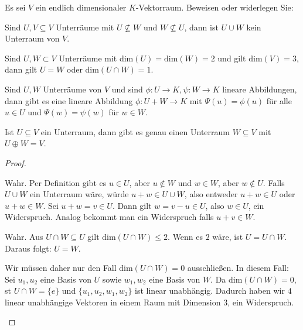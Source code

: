 \begin{Problem}
	Es sei $V$ ein endlich dimensionaler $K$-Vektorraum. Beweisen oder widerlegen Sie:
\begin{parts}
\item Sind $U,V\subseteq V$ Unterräume mit $U\not\subseteq W$ und $W\not\subseteq U$, dann ist $U\cup W$ kein Unterraum von $V$.
\item Sind $U,W\subset V$ Unterräume mit $\text{dim}(U)=\text{dim}(W)=2$ und gilt $\text{dim}(V)=3$, dann gilt $U=W$ oder $\text{dim}(U\cap W)=1$.
\item Sind $U,W$ Unterräume von $V$ und sind $\phi:U\to K,\psi:W\to K$ lineare Abbildungen, dann gibt es eine lineare Abbildung $\phi:U+W\to K$ mit $\Psi(u)=\phi(u)$ f\"{u}r alle $u\in U$ und $\Psi(w)=\psi(w)$ f\"{u}r $w\in W$.
\item Ist $U\subseteq V$ ein Unterraum, dann gibt es genau einen Unterraum $W\subseteq V$ mit $U\oplus W=V$.
\end{parts}
\end{Problem}
\begin{proof}
	\begin{parts}
	\item Wahr. Per Definition gibt es $u\in U$, aber $u \not\in W$ und $w\in W$, aber $w\not\in U$. Falls $U\cup W$ ein Unterraum wäre, würde $u+w\in U\cup W$, also entweder $u+w\in U$ oder $u+w\in W$. Sei $u+w=v\in U$. Dann gilt $w=v-u\in U$, also $w\in U$, ein Widerspruch. Analog bekommt man ein Widerspruch falls $u+v\in W$.
	\item Wahr. Aus $U\cap W\subseteq U$ gilt $\text{dim}(U\cap W)\le 2$. Wenn es $2$ wäre, ist $U=U\cap W$. Daraus folgt: $U=W$.

	Wir müssen daher nur den Fall $\text{dim}(U\cap W)=0$ ausschließen. In diesem Fall: Sei $u_1,u_2$ eine Basis von $U$ sowie $w_1,w_2$ eine Basis von $W$. Da $\text{dim}(U\cap W)=0$, st $U\cap W=\{e\} $ und $\{u_1,u_2,w_1,w_2\} $ ist linear unabhängig. Dadurch haben wir $4$ linear unabhängige Vektoren in einem Raum mit Dimension $3$, ein Widerspruch.
	\end{parts}
\end{proof}
